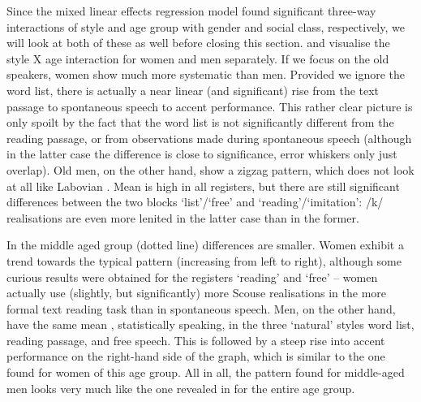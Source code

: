 Since the mixed linear effects regression model found significant three-way interactions of style and age group with gender and social class, respectively, we will look at both of these as well before closing this section.
 and  visualise the style X age interaction for women and men separately.
If we focus on the old speakers, women show much more systematic  than men.
Provided we ignore the word list, there is actually a near linear (and significant) rise from the text passage to spontaneous speech to accent performance.
This rather clear picture is only spoilt by the fact that the word list is not significantly different from the reading passage, or from observations made during spontaneous speech (although in the latter case the difference is close to significance, error whiskers only just overlap).
Old men, on the other hand, show a zigzag pattern, which does not look at all like Labovian .
Mean  is high in all registers, but there are still significant differences between the two blocks `list'/`free' and `reading'/`imitation': /k/ realisations are even more lenited in the latter case than in the former.

In the middle aged group (dotted line) differences are smaller.
Women exhibit a trend towards the typical  pattern (increasing  from left to right), although some curious results were obtained for the registers `reading' and `free' -- women actually use (slightly, but significantly) more Scouse realisations in the more formal text reading task than in spontaneous speech.
Men, on the other hand, have the same mean , statistically speaking, in the three `natural' styles word list, reading passage, and free speech.
This is followed by a steep rise into accent performance on the right-hand side of the graph, which is similar to the one found for women of this age group.
All in all, the pattern found for middle-aged men looks very much like the one revealed in  for the entire age group.


